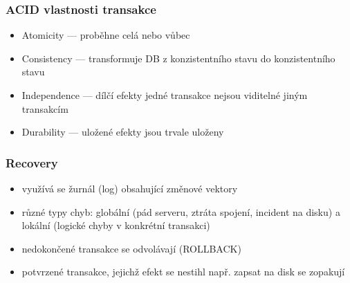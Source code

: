 \subsubsection*{ACID vlastnosti transakce}
\begin{itemize}
	\item Atomicity --- proběhne celá nebo vůbec
	\item Consistency --- transformuje DB z konzistentního stavu do konzistentního stavu
	\item Independence --- dílčí efekty jedné transakce nejsou viditelné jiným transakcím
	\item Durability --- uložené efekty jsou trvale uloženy
\end{itemize}

\subsubsection*{Recovery}
\begin{itemize}
	\item využívá se žurnál (log) obsahující změnové vektory
	\item různé typy chyb: globální (pád serveru, ztráta spojení, incident na disku) a lokální (logické chyby v konkrétní transakci)
	\item nedokončené transakce se odvolávají (ROLLBACK)
	\item potvrzené transakce, jejichž efekt se nestihl např. zapsat na disk se zopakují
\end{itemize}

